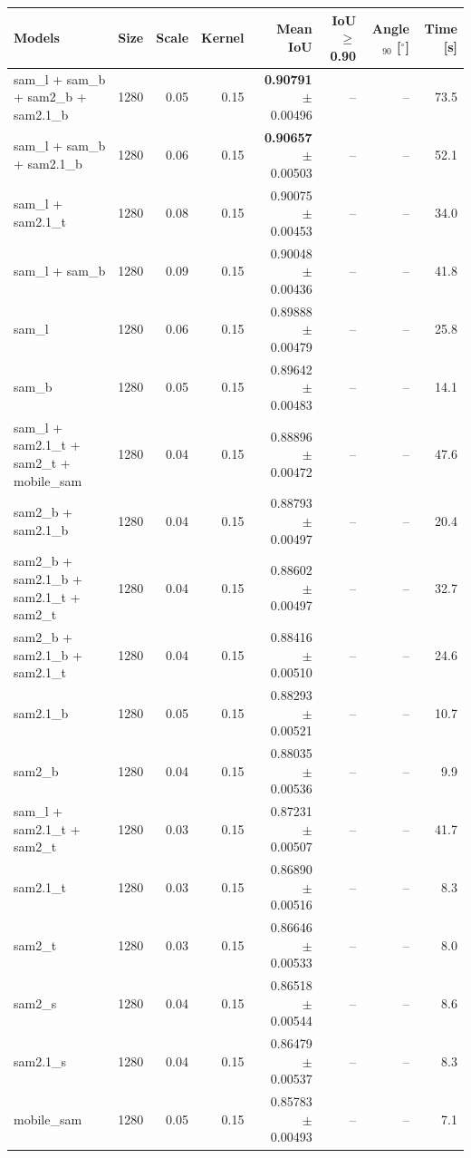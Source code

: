 \begin{tabular}{lrrrrrrr}
  \toprule
  Models & Size & Scale & Kernel & Mean IoU & IoU$\geq$0.90 & Angle$_{90}$ [$^\circ$] & Time [s] \\
  \midrule
  sam\_l + sam\_b + sam2\_b + sam2.1\_b & 1280 & 0.05 & 0.15 & \textbf{0.90791} $\pm$ 0.00496 & -- & -- & 73.5 \\
  sam\_l + sam\_b + sam2.1\_b & 1280 & 0.06 & 0.15 & \textbf{0.90657} $\pm$ 0.00503 & -- & -- & 52.1 \\
  sam\_l + sam2.1\_t & 1280 & 0.08 & 0.15 & 0.90075 $\pm$ 0.00453 & -- & -- & 34.0 \\
  sam\_l + sam\_b & 1280 & 0.09 & 0.15 & 0.90048 $\pm$ 0.00436 & -- & -- & 41.8 \\
  sam\_l & 1280 & 0.06 & 0.15 & 0.89888 $\pm$ 0.00479 & -- & -- & 25.8 \\
  sam\_b & 1280 & 0.05 & 0.15 & 0.89642 $\pm$ 0.00483 & -- & -- & 14.1 \\
  sam\_l + sam2.1\_t + sam2\_t + mobile\_sam & 1280 & 0.04 & 0.15 & 0.88896 $\pm$ 0.00472 & -- & -- & 47.6 \\
  sam2\_b + sam2.1\_b & 1280 & 0.04 & 0.15 & 0.88793 $\pm$ 0.00497 & -- & -- & 20.4 \\
  sam2\_b + sam2.1\_b + sam2.1\_t + sam2\_t & 1280 & 0.04 & 0.15 & 0.88602 $\pm$ 0.00497 & -- & -- & 32.7 \\
  sam2\_b + sam2.1\_b + sam2.1\_t & 1280 & 0.04 & 0.15 & 0.88416 $\pm$ 0.00510 & -- & -- & 24.6 \\
  sam2.1\_b & 1280 & 0.05 & 0.15 & 0.88293 $\pm$ 0.00521 & -- & -- & 10.7 \\
  sam2\_b & 1280 & 0.04 & 0.15 & 0.88035 $\pm$ 0.00536 & -- & -- & 9.9 \\
  sam\_l + sam2.1\_t + sam2\_t & 1280 & 0.03 & 0.15 & 0.87231 $\pm$ 0.00507 & -- & -- & 41.7 \\
  sam2.1\_t & 1280 & 0.03 & 0.15 & 0.86890 $\pm$ 0.00516 & -- & -- & 8.3 \\
  sam2\_t & 1280 & 0.03 & 0.15 & 0.86646 $\pm$ 0.00533 & -- & -- & 8.0 \\
  sam2\_s & 1280 & 0.04 & 0.15 & 0.86518 $\pm$ 0.00544 & -- & -- & 8.6 \\
  sam2.1\_s & 1280 & 0.04 & 0.15 & 0.86479 $\pm$ 0.00537 & -- & -- & 8.3 \\
  mobile\_sam & 1280 & 0.05 & 0.15 & 0.85783 $\pm$ 0.00493 & -- & -- & 7.1 \\
  \bottomrule
\end{tabular}
